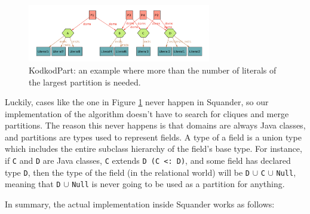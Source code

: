 \documentclass[11pt,twoside,a4paper]{book}
\begin{document}
\begin{figure}[ht]
\begin{center}
\includegraphics[width=8cm]{figures/kodkodpart}
\caption{KodkodPart: an example where more than the number of literals of the
largest partition is needed.}
\label{fig:kodkodpart}
\end{center}
\end{figure}

Luckily, cases like the one in Figure \ref{fig:kodkodpart} never happen in
Squander, so our implementation of the algorithm doesn't have to search for
cliques and merge partitions. The reason this never happens is that domains are
always Java classes, and partitions are types used to represent fields. A type
of a field is a union type which includes the entire subclass hierarchy of the
field’s base type. For instance, if \verb|C| and \verb|D| are Java classes,
\verb|C| extends \verb|D (C <: D)|, and some field has declared type \verb|D|,
then the type of the field (in the relational world) will be \verb|D| $\cup$
\verb|C| $\cup$ \verb|Null|, meaning that \verb|D| $\cup$ \verb|Null| is
never going to be used as a partition for anything.

In summary, the actual implementation inside Squander works as follows:
\end{document}

